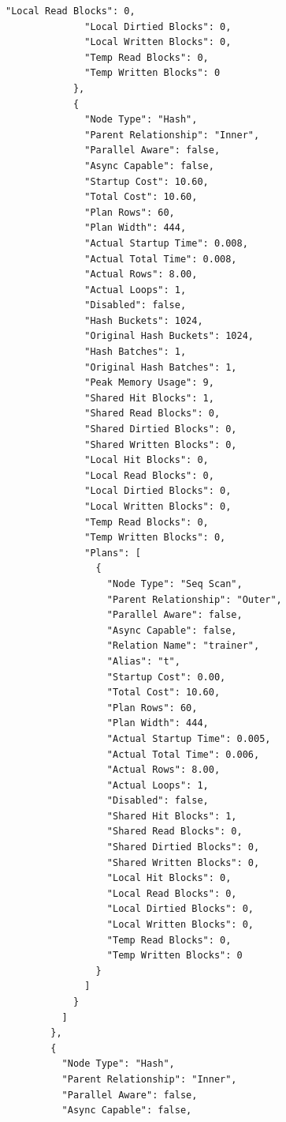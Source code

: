 \documentclass[oneside,a4paper,14pt]{extarticle}
\begin{document}
\begin{Verbatim}[fontsize=\tiny,breaklines=true,breakanywhere=true]
              "Local Read Blocks": 0,
              "Local Dirtied Blocks": 0,
              "Local Written Blocks": 0,
              "Temp Read Blocks": 0,
              "Temp Written Blocks": 0
            },
            {
              "Node Type": "Hash",
              "Parent Relationship": "Inner",
              "Parallel Aware": false,
              "Async Capable": false,
              "Startup Cost": 10.60,
              "Total Cost": 10.60,
              "Plan Rows": 60,
              "Plan Width": 444,
              "Actual Startup Time": 0.008,
              "Actual Total Time": 0.008,
              "Actual Rows": 8.00,
              "Actual Loops": 1,
              "Disabled": false,
              "Hash Buckets": 1024,
              "Original Hash Buckets": 1024,
              "Hash Batches": 1,
              "Original Hash Batches": 1,
              "Peak Memory Usage": 9,
              "Shared Hit Blocks": 1,
              "Shared Read Blocks": 0,
              "Shared Dirtied Blocks": 0,
              "Shared Written Blocks": 0,
              "Local Hit Blocks": 0,
              "Local Read Blocks": 0,
              "Local Dirtied Blocks": 0,
              "Local Written Blocks": 0,
              "Temp Read Blocks": 0,
              "Temp Written Blocks": 0,
              "Plans": [
                {
                  "Node Type": "Seq Scan",
                  "Parent Relationship": "Outer",
                  "Parallel Aware": false,
                  "Async Capable": false,
                  "Relation Name": "trainer",
                  "Alias": "t",
                  "Startup Cost": 0.00,
                  "Total Cost": 10.60,
                  "Plan Rows": 60,
                  "Plan Width": 444,
                  "Actual Startup Time": 0.005,
                  "Actual Total Time": 0.006,
                  "Actual Rows": 8.00,
                  "Actual Loops": 1,
                  "Disabled": false,
                  "Shared Hit Blocks": 1,
                  "Shared Read Blocks": 0,
                  "Shared Dirtied Blocks": 0,
                  "Shared Written Blocks": 0,
                  "Local Hit Blocks": 0,
                  "Local Read Blocks": 0,
                  "Local Dirtied Blocks": 0,
                  "Local Written Blocks": 0,
                  "Temp Read Blocks": 0,
                  "Temp Written Blocks": 0
                }
              ]
            }
          ]
        },
        {
          "Node Type": "Hash",
          "Parent Relationship": "Inner",
          "Parallel Aware": false,
          "Async Capable": false,

\end{Verbatim}
\end{document}
